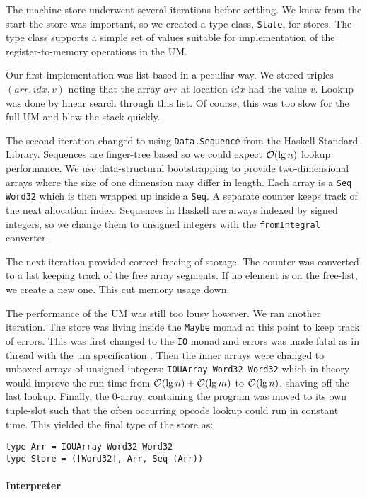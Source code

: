 The machine store underwent several iterations before settling. We
knew from the start the store was important, so we created a type
class, \texttt{State}, for stores. The type class supports a simple
set of values suitable for implementation of the register-to-memory
operations in the UM.

Our first implementation was list-based in a peculiar way. We stored
triples $(arr, idx, v)$ noting that the array $arr$ at location $idx$
had the value $v$. Lookup was done by linear search through this
list.  Of course, this was too slow for the
full UM and blew the stack quickly.

The second iteration changed to using \texttt{Data.Sequence} from the
Haskell Standard Library. Sequences are finger-tree based so we could
expect $\mathcal{O}(\lg n)$ lookup performance. We use data-structural
bootstrapping \cite{okasaki+pfds} to provide two-dimensional arrays
where the size of one dimension may differ in length. Each array is a
\texttt{Seq Word32} which is then wrapped up inside a \texttt{Seq}. A
separate counter keeps track of the next allocation index. Sequences
in Haskell are always indexed by signed integers, so we change them to
unsigned integers with the \texttt{fromIntegral} converter.

The next iteration provided correct freeing of storage. The counter
was converted to a list keeping track of the free array segments. If
no element is on the free-list, we create a new one. This cut memory
usage down.

The performance of the UM was still too lousy however. We ran
another iteration. The store was living inside the \texttt{Maybe}
monad at this point to keep track of errors. This was first changed to the
\texttt{IO} monad and errors was made fatal as in thread with the um
specification \cite{um+spec}. Then the inner arrays were changed to
unboxed arrays of unsigned integers: \texttt{IOUArray Word32 Word32}
which in theory would improve the run-time from $\mathcal{O}(\lg n) + \mathcal{O}(\lg
  m)$ to $\mathcal{O}(\lg n)$, shaving off the last lookup. Finally, the
$0$-array, containing the program was moved to its own tuple-slot such
that the often occurring opcode lookup could run in constant
time. This yielded the final type of the store as:
\begin{verbatim}
type Arr = IOUArray Word32 Word32
type Store = ([Word32], Arr, Seq (Arr))
\end{verbatim}

\paragraph{Interpreter}
\label{sec:interpreter}

